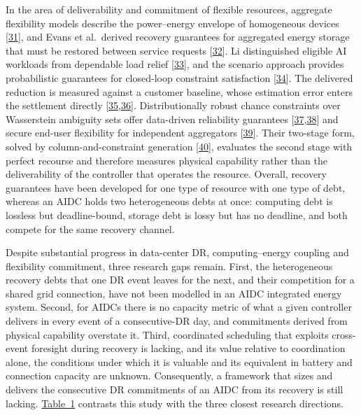 \documentclass[a4paper,twocolumn,fleqn,10pt]{article}
\begin{document}
In the area of deliverability and commitment of flexible resources, aggregate flexibility models describe the power--energy envelope of homogeneous devices [\hyperlink{ref31}{31}], and Evans et al.~derived recovery guarantees for aggregated energy storage that must be restored between service requests [\hyperlink{ref32}{32}]. Li distinguished eligible AI workloads from dependable load relief [\hyperlink{ref33}{33}], and the scenario approach provides probabilistic guarantees for closed-loop constraint satisfaction [\hyperlink{ref34}{34}]. The delivered reduction is measured against a customer baseline, whose estimation error enters the settlement directly [\hyperlink{ref35}{35},\hyperlink{ref36}{36}]. Distributionally robust chance constraints over Wasserstein ambiguity sets offer data-driven reliability guarantees [\hyperlink{ref37}{37},\hyperlink{ref38}{38}] and secure end-user flexibility for independent aggregators [\hyperlink{ref39}{39}]. Their two-stage form, solved by column-and-constraint generation [\hyperlink{ref40}{40}], evaluates the second stage with perfect recourse and therefore measures physical capability rather than the deliverability of the controller that operates the resource. Overall, recovery guarantees have been developed for one type of resource with one type of debt, whereas an AIDC holds two heterogeneous debts at once: computing debt is lossless but deadline-bound, storage debt is lossy but has no deadline, and both compete for the same recovery channel.

Despite substantial progress in data-center DR, computing--energy coupling and flexibility commitment, three research gaps remain. First, the heterogeneous recovery debts that one DR event leaves for the next, and their competition for a shared grid connection, have not been modelled in an AIDC integrated energy system. Second, for AIDCs there is no capacity metric of what a given controller delivers in every event of a consecutive-DR day, and commitments derived from physical capability overstate it. Third, coordinated scheduling that exploits cross-event foresight during recovery is lacking, and its value relative to coordination alone, the conditions under which it is valuable and its equivalent in battery and connection capacity are unknown. Consequently, a framework that sizes and delivers the consecutive DR commitments of an AIDC from its recovery is still lacking. \hyperref[tab1]{Table~1} contrasts this study with the three closest research directions.
\end{document}
